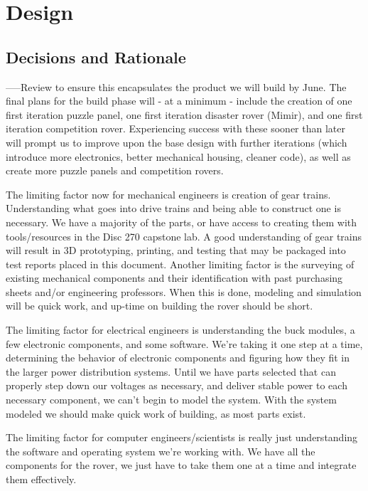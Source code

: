 \documentclass[a4paper, 10pt]{article}
\begin{document}
\pagebreak
	
\section{Design}
	\subsection{Decisions and Rationale}
	-----Review to ensure this encapsulates the product we will build by June.
	The final plans for the build phase will - at a minimum - include the creation of one first iteration puzzle panel, one first iteration disaster rover (Mimir), and one first iteration competition rover. Experiencing success with these sooner than later will prompt us to improve upon the base design with further iterations (which introduce more electronics, better mechanical housing, cleaner code), as well as create more puzzle panels and competition rovers.
	
	The limiting factor now for mechanical engineers is creation of gear trains. Understanding what goes into drive trains and being able to construct one is necessary. We have a majority of the parts, or have access to creating them with tools/resources in the Disc 270 capstone lab. A good understanding of gear trains will result in 3D prototyping, printing, and testing that may be packaged into test reports placed in this document. Another limiting factor is the surveying of existing mechanical components and their identification with past purchasing sheets and/or engineering professors. When this is done, modeling and simulation will be quick work, and up-time on building the rover should be short.

	The limiting factor for electrical engineers is understanding the buck modules, a few electronic components, and some software. We're taking it one step at a time, determining the behavior of electronic components and figuring how they fit in the larger power distribution systems. Until we have parts selected that can properly step down our voltages as necessary, and deliver stable power to each necessary component, we can't begin to model the system. With the system modeled we should make quick work of building, as most parts exist.

	The limiting factor for computer engineers/scientists is really just understanding the software and operating system we're working with. We have all the components for the rover, we just have to take them one at a time and integrate them effectively.
\end{document}
